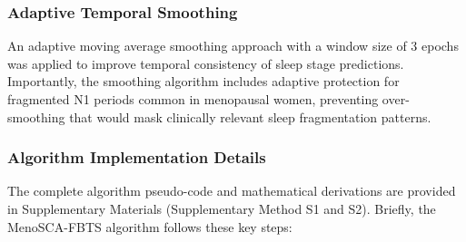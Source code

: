 \documentclass[ASNA,twocolumn]{USG}
\begin{document}
\subsubsection{Adaptive Temporal Smoothing}
An adaptive moving average smoothing approach with a window size of 3 epochs was applied to improve temporal consistency of sleep stage predictions. Importantly, the smoothing algorithm includes adaptive protection for fragmented N1 periods common in menopausal women, preventing over-smoothing that would mask clinically relevant sleep fragmentation patterns.


\subsubsection{Algorithm Implementation Details}

The complete algorithm pseudo-code and mathematical derivations are provided in Supplementary Materials (Supplementary Method S1 and S2). Briefly, the MenoSCA-FBTS algorithm follows these key steps:
\end{document}
